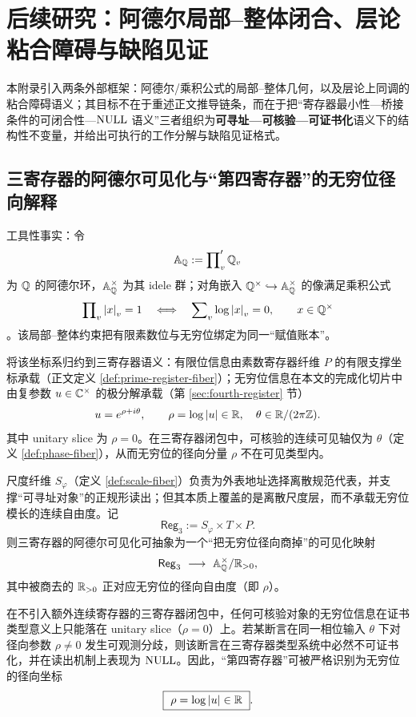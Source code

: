 \section{后续研究：阿德尔局部--整体闭合、层论粘合障碍与缺陷见证}\label{app:adelic-sheaf-null-witness}
本附录引入两条外部框架：阿德尔/乘积公式的局部--整体几何，以及层论上同调的粘合障碍语义；其目标不在于重述正文推导链条，而在于把“寄存器最小性—桥接条件的可闭合性—$\mathrm{NULL}$ 语义”三者组织为\textbf{可寻址—可核验—可证书化}语义下的结构性不变量，并给出可执行的工作分解与缺陷见证格式。

\subsection{三寄存器的阿德尔可见化与“第四寄存器”的无穷位径向解释}\label{subsubsec:future-adelic-fourth}
工具性事实：令
$$
\mathbb{A}_{\mathbb{Q}}:=\prod\nolimits_v' \mathbb{Q}_v
$$
为 $\mathbb{Q}$ 的阿德尔环，$\mathbb{A}_{\mathbb{Q}}^\times$ 为其 idele 群；对角嵌入 $\mathbb{Q}^\times\hookrightarrow \mathbb{A}_{\mathbb{Q}}^\times$ 的像满足乘积公式
$$
\prod\nolimits_v \left\lvert x\right\rvert_v=1
\quad\Longleftrightarrow\quad
\sum\nolimits_v \log\left\lvert x\right\rvert_v=0,\qquad x\in\mathbb{Q}^\times
$$
\cite{Sutherland2017AdelesStrongApprox,Conrad2005CompactIdele}。该局部--整体约束把有限素数位与无穷位绑定为同一“赋值账本”。
\par
将该坐标系归约到三寄存器语义：有限位信息由素数寄存器纤维 $P$ 的有限支撑坐标承载（正文定义 \ref{def:prime-register-fiber}）；无穷位信息在本文的完成化切片中由复参数 $u\in\mathbb{C}^\times$ 的极分解承载（第 \ref{sec:fourth-register} 节）
$$
u=e^{\rho+i\theta},\qquad \rho=\log\left\lvert u\right\rvert\in\mathbb{R},\quad \theta\in\mathbb{R}/(2\pi\mathbb{Z}).
$$
其中 unitary slice 为 $\rho=0$。在三寄存器闭包中，可核验的连续可见轴仅为 $\theta$（定义 \ref{def:phase-fiber}），从而无穷位的径向分量 $\rho$ 不在可见类型内。
\par
尺度纤维 $S_\varphi$（定义 \ref{def:scale-fiber}）负责为外表地址选择离散规范代表，并支撑“可寻址对象”的正规形读出；但其本质上覆盖的是离散尺度层，而不承载无穷位模长的连续自由度。记
$$
\mathsf{Reg}_3:=S_\varphi\times T\times P.
$$
则三寄存器的阿德尔可见化可抽象为一个“把无穷位径向商掉”的可见化映射
$$
\mathsf{Reg}_3\ \longrightarrow\ \mathbb{A}_\QQ^\times/\RR_{>0},
$$
其中被商去的 $\mathbb{R}_{>0}$ 正对应无穷位的径向自由度（即 $\rho$）。

\begin{theorem}\label{thm:future-missing-infty-radial}
在不引入额外连续寄存器的三寄存器闭包中，任何可核验对象的无穷位信息在证书类型意义上只能落在 unitary slice（$\rho=0$）上。若某断言在同一相位输入 $\theta$ 下对径向参数 $\rho\neq 0$ 发生可观测分歧，则该断言在三寄存器类型系统中必然不可证书化，并在读出机制上表现为 $\mathrm{NULL}$。因此，“第四寄存器”可被严格识别为无穷位的径向坐标
$$
\boxed{\ \rho=\log\abs{u}\in\RR\ }.
$$
\end{theorem}

